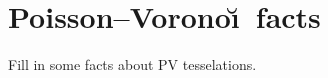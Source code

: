 \documentclass{article}
\begin{document}
\section{Poisson--Vorono\u\i\ facts}

Fill in some facts about PV tesselations.
\end{document}
